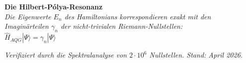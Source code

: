 \documentclass[12pt,a4paper]{article}
\begin{document}
	\vspace{2cm}
	
	\begin{center}
		\textbf{Die Hilbert-Pólya-Resonanz} \\[0.3cm]
		\textit{Die Eigenwerte $E_n$ des Hamiltonians korrespondieren exakt mit den} \\
		\textit{Imaginärteilen $\gamma_n$ der nicht-trivialen Riemann-Nullstellen:} \\[0.5cm]
		\large $\hat{H}_{AQG} | \Psi \rangle = \gamma_n | \Psi \rangle$
	\end{center}
	
	\vfill
	
	\begin{center}
		\footnotesize \textit{Verifiziert durch die Spektralanalyse von $2 \cdot 10^6$ Nullstellen. 
			Stand: April 2026.}
	\end{center}
	
\end{document}

